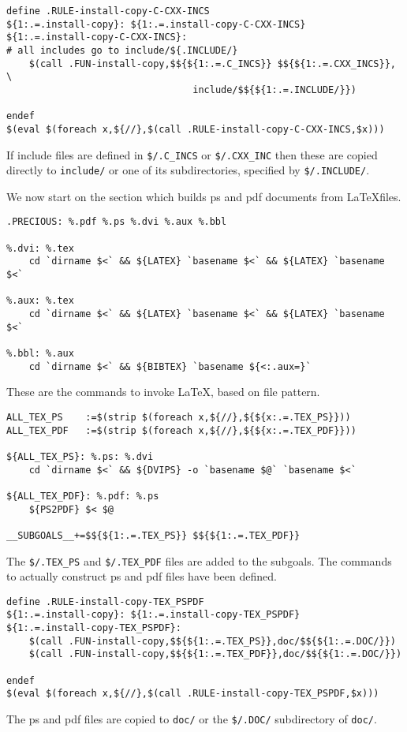 \documentclass{article}
\begin{document}
\begin{verbatim}
define .RULE-install-copy-C-CXX-INCS
${1:.=.install-copy}: ${1:.=.install-copy-C-CXX-INCS}
${1:.=.install-copy-C-CXX-INCS}:
# all includes go to include/${.INCLUDE/}
	$(call .FUN-install-copy,$${${1:.=.C_INCS}} $${${1:.=.CXX_INCS}}, \
                                 include/$${${1:.=.INCLUDE/}})

endef
$(eval $(foreach x,${//},$(call .RULE-install-copy-C-CXX-INCS,$x)))
\end{verbatim}
If include files are defined in \verb+$/.C_INCS+ or \verb+$/.CXX_INC+
then these are copied directly to \verb+include/+ or one of its
subdirectories, specified by \verb+$/.INCLUDE/+.

We now start on the section which builds ps and pdf documents from
\LaTeX files.
\begin{verbatim}
.PRECIOUS: %.pdf %.ps %.dvi %.aux %.bbl

%.dvi: %.tex
	cd `dirname $<` && ${LATEX} `basename $<` && ${LATEX} `basename $<`

%.aux: %.tex
	cd `dirname $<` && ${LATEX} `basename $<` && ${LATEX} `basename $<`

%.bbl: %.aux
	cd `dirname $<` && ${BIBTEX} `basename ${<:.aux=}`
\end{verbatim}
These are the commands to invoke \LaTeX, based on file pattern.

\begin{verbatim}
ALL_TEX_PS    :=$(strip $(foreach x,${//},${${x:.=.TEX_PS}}))
ALL_TEX_PDF   :=$(strip $(foreach x,${//},${${x:.=.TEX_PDF}}))

${ALL_TEX_PS}: %.ps: %.dvi
	cd `dirname $<` && ${DVIPS} -o `basename $@` `basename $<`

${ALL_TEX_PDF}: %.pdf: %.ps
	${PS2PDF} $< $@

__SUBGOALS__+=$${${1:.=.TEX_PS}} $${${1:.=.TEX_PDF}}
\end{verbatim}
The \verb+$/.TEX_PS+ and \verb+$/.TEX_PDF+ files are added to the
subgoals.  The commands to actually construct ps and pdf files 
have been defined.

\begin{verbatim}
define .RULE-install-copy-TEX_PSPDF
${1:.=.install-copy}: ${1:.=.install-copy-TEX_PSPDF}
${1:.=.install-copy-TEX_PSPDF}:
	$(call .FUN-install-copy,$${${1:.=.TEX_PS}},doc/$${${1:.=.DOC/}})
	$(call .FUN-install-copy,$${${1:.=.TEX_PDF}},doc/$${${1:.=.DOC/}})

endef
$(eval $(foreach x,${//},$(call .RULE-install-copy-TEX_PSPDF,$x)))
\end{verbatim}
The ps and pdf files are copied to \verb+doc/+ or the
\verb+$/.DOC/+ subdirectory of \verb+doc/+.
\end{document}
